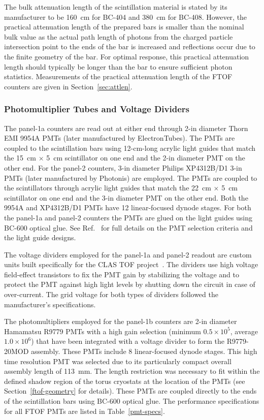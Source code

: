 \documentclass[3p,times,twocolumn]{elsarticle}
\begin{document}
The bulk attenuation length of the scintillation material is stated by its manufacturer to be 160~cm
for BC-404 and 380~cm for BC-408. However, the practical attenuation length of the prepared bars
is smaller than the nominal bulk value as the actual path length of photons from the charged particle
intersection point to the ends of the bar is increased and reflections occur due to the finite geometry
of the bar. For optimal response, this practical attenuation length should typically be longer than the
bar to ensure sufficient photon statistics. Measurements of the practical attenuation length of the
FTOF counters are given in Section~\ref{sec:attlen}.

\subsubsection{Photomultiplier Tubes and Voltage Dividers}

The panel-1a counters are read out at either end through 2-in diameter Thorn EMI 9954A PMTs (later
manufactured by ElectronTubes). The PMTs are coupled to the scintillation bars using 12-cm-long acrylic
light guides that match the 15~cm $\times$ 5~cm scintillator on one end and the 2-in diameter PMT on
the other end.  For the panel-2 counters, 3-in diameter Philips XP4312B/D1 3-in PMTs (later manufactured
by Photonis) are employed. The PMTs are coupled to the scintillators through acrylic light guides that match
the 22~cm $\times$ 5~cm scintillator on one end and the 3-in diameter PMT on the other end. Both the
9954A and XP4312B/D1 PMTs have 12 linear-focused dynode stages. For both the panel-1a and panel-2
counters the PMTs are glued on the light guides using BC-600 optical glue. See Ref.~\cite{tof-nim} for
full details on the PMT selection criteria and the light guide designs.

The voltage dividers employed for the panel-1a and panel-2 readout are custom units built specifically
for the CLAS TOF project~\cite{tof-nim}. The dividers use high voltage field-effect transistors to fix
the PMT gain by stabilizing the voltage and to protect the PMT against high light levels by shutting down
the circuit in case of over-current. The grid voltage for both types of dividers followed the
manufacturer's specifications.

The photomultipliers employed for the panel-1b counters are 2-in diameter Hamamatsu R9779 PMTs with
a high gain selection (minimum $0.5 \times 10^5$, average $1.0 \times 10^6$) that have been integrated
with a voltage divider to form the R9779-20MOD assembly. These PMTs include 8 linear-focused dynode
stages. This high time resolution PMT was selected due to its particularly compact overall assembly length
of 113~mm. The length restriction was necessary to fit within the defined shadow region of the torus
cryostats at the location of the PMTs (see Section~\ref{ftof-geometry} for details). These PMTs are
coupled directly to the ends of the scintillation bars using BC-600 optical glue. The performance
specifications for all FTOF PMTs are listed in Table~\ref{pmt-specs}.
\end{document}
